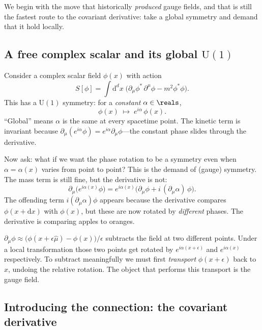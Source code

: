 \documentclass[11pt]{article}
\newcommand{\dd}{\mathrm{d}}                 %
\newcommand{\Uone}{\mathrm{U}(1)}
\begin{document}
We begin with the move that historically \emph{produced} gauge fields, and that is
still the fastest route to the covariant derivative: take a global symmetry and demand
that it hold locally.

\subsection{A free complex scalar and its global \texorpdfstring{$\Uone$}{U(1)}}

Consider a complex scalar field $\phi(x)$ with action
\[
S[\phi] = \int \dd^d x \;\Big(\partial_\mu \phi^* \,\partial^\mu \phi - m^2 \phi^*\phi\Big).
\]
This has a  $\Uone$ symmetry: for a \emph{constant} $\alpha \in \reals$,
\[
\phi(x) \;\longmapsto\; e^{i\alpha}\,\phi(x).
\]
``Global'' means $\alpha$ is the same at every spacetime point. The kinetic term is
invariant because $\partial_\mu(e^{i\alpha}\phi) = e^{i\alpha}\partial_\mu\phi$---the
constant phase slides through the derivative.

Now ask: what if we want the phase rotation to be a symmetry even when $\alpha=\alpha(x)$
varies from point to point? This is the demand of  (gauge) symmetry. The
mass term is still fine, but the derivative is not:
\[
\partial_\mu\big(e^{i\alpha(x)}\phi\big)
 = e^{i\alpha(x)}\big(\partial_\mu\phi + i\,(\partial_\mu\alpha)\,\phi\big).
\]
The offending term $i(\partial_\mu\alpha)\phi$ appears because the derivative compares
$\phi(x+\dd x)$ with $\phi(x)$, but these are now rotated by \emph{different} phases.
The derivative is comparing apples to oranges.

\begin{iintuition}
$\partial_\mu \phi \approx \big(\phi(x+\epsilon \hat\mu) - \phi(x)\big)/\epsilon$
subtracts the field at two different points. Under a local transformation those two
points get rotated by $e^{i\alpha(x+\epsilon)}$ and $e^{i\alpha(x)}$ respectively. To
subtract meaningfully we must first \emph{transport} $\phi(x+\epsilon)$ back to $x$,
undoing the relative rotation. The object that performs this transport is the gauge
field.
\end{iintuition}

\subsection{Introducing the connection: the covariant derivative}
\end{document}

